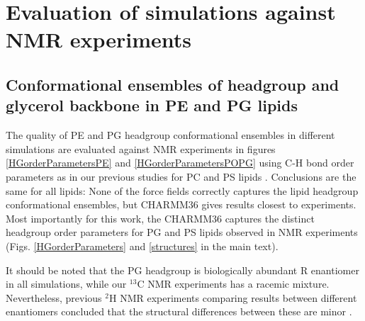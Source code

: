 \documentclass[journal=jpcbfk]{achemso}
\begin{document}
\clearpage
\section{Evaluation of simulations against NMR experiments}
\subsection{Conformational ensembles of headgroup and glycerol backbone in PE and PG lipids}

The quality of PE and PG headgroup conformational ensembles in different simulations are evaluated against NMR experiments in figures \ref{HGorderParametersPE} and \ref{HGorderParametersPOPG} using C-H bond order parameters as in our previous studies for PC and PS lipids \cite{botan15,antila19}. Conclusions are the same for all lipids: None of the force fields correctly captures the lipid headgroup conformational ensembles, but CHARMM36 gives results closest to experiments. Most importantly for this work, the CHARMM36 captures the distinct headgroup order parameters for PG and PS lipids observed in NMR experiments (Figs. \ref{HGorderParameters} and \ref{structures} in the main text). 

It should be noted that the PG headgroup is biologically abundant R enantiomer in all simulations, while our $^{13}$C NMR experiments has a racemic mixture. Nevertheless, previous $^{2}$H NMR experiments comparing results between different enantiomers concluded that the structural differences between these are minor \cite{wohlgemuth80}.

\end{document}
